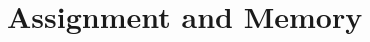 \documentclass[fleqn]{beamer} %
\newcommand{\sectiontitleII}{Variables and Type}
\newcommand{\sectiontitleIII}{Assignment and Memory}
\newcommand{\btVFill}{\vskip0pt plus 1filll}
\begin{document}
	

	
		
	


\section{\sectiontitleIII}
\end{document}
